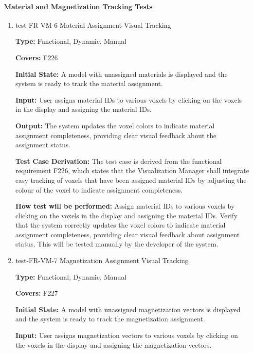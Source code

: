 \documentclass[12pt, titlepage]{article}
\begin{document}
\paragraph{Material and Magnetization Tracking Tests}

\begin{enumerate}

\item{test-FR-VM-6 Material Assignment Visual Tracking\\}

\textbf{Type:} Functional, Dynamic, Manual

\textbf{Covers:} F226
					
\textbf{Initial State:} A model with unassigned materials is displayed and the system is ready to track the material assignment.
					
\textbf{Input:} User assigns material IDs to various voxels by clicking on the voxels in the display and assigning the material IDs.
					
\textbf{Output:} The system updates the voxel colors to indicate material assignment completeness, providing clear visual feedback about the assignment status.

\textbf{Test Case Derivation:} The test case is derived from the functional requirement F226, which states that the Visualization Manager shall integrate easy tracking of voxels that have been assigned material IDs by adjusting the colour of the voxel to indicate assignment completeness.
					
\textbf{How test will be performed:} Assign material IDs to various voxels by clicking on the voxels in the display and assigning the material IDs. Verify that the system correctly updates the voxel colors to indicate material assignment completeness, providing clear visual feedback about assignment status. This will be tested manually by the developer of the system.

\item{test-FR-VM-7 Magnetization Assignment Visual Tracking\\}

\textbf{Type:} Functional, Dynamic, Manual

\textbf{Covers:} F227
					
\textbf{Initial State:} A model with unassigned magnetization vectors is displayed and the system is ready to track the magnetization assignment.
					
\textbf{Input:} User assigns magnetization vectors to various voxels by clicking on the voxels in the display and assigning the magnetization vectors.
					

\end{enumerate}
\end{document}
